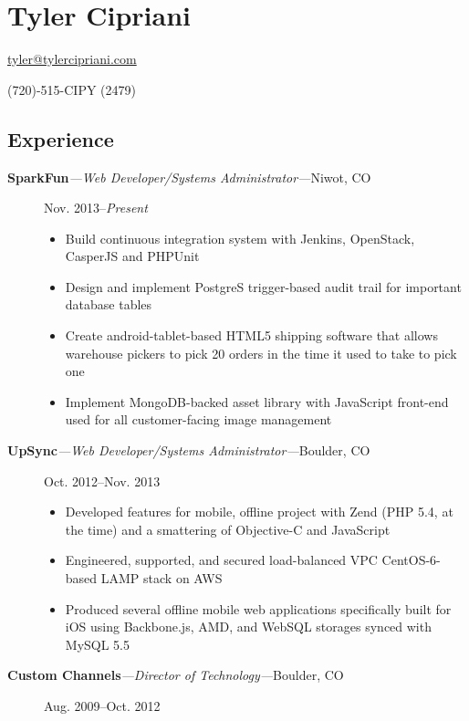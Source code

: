 \section{Tyler Cipriani}\label{tyler-cipriani}

\href{mailto:tyler@tylercipriani.com}{tyler@tylercipriani.com}

(720)-515-CIPY (2479)

\subsection{Experience}\label{experience}

\begin{description}
\item[\textbf{SparkFun}\emph{---Web Developer/Systems
Administrator---}Niwot, CO]
Nov. 2013--\emph{Present}

\begin{itemize}
\item
  Build continuous integration system with Jenkins, OpenStack, CasperJS
  and PHPUnit
\item
  Design and implement PostgreS trigger-based audit trail for important
  database tables
\item
  Create android-tablet-based HTML5 shipping software that allows
  warehouse pickers to pick 20 orders in the time it used to take to
  pick one
\item
  Implement MongoDB-backed asset library with JavaScript front-end used
  for all customer-facing image management
\end{itemize}
\item[\textbf{UpSync}\emph{---Web Developer/Systems
Administrator---}Boulder, CO]
Oct. 2012--Nov. 2013

\begin{itemize}
\item
  Developed features for mobile, offline project with Zend (PHP 5.4, at
  the time) and a smattering of Objective-C and JavaScript
\item
  Engineered, supported, and secured load-balanced VPC CentOS-6-based
  LAMP stack on AWS
\item
  Produced several offline mobile web applications specifically built
  for iOS using Backbone.js, AMD, and WebSQL storages synced with MySQL
  5.5
\end{itemize}
\item[\textbf{Custom Channels}\emph{---Director of
Technology---}Boulder, CO]
Aug. 2009--Oct. 2012


\end{description}

